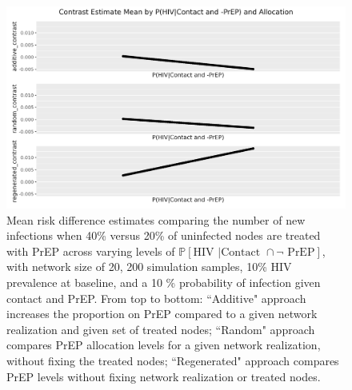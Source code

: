 \documentclass{article}
\theoremstyle{definition}
\begin{document}
\begin{figure}[H]
    \centering
    \includegraphics[width=\linewidth]{Corrected Figures/p1 Mean plots.png}
    \caption{Mean risk difference estimates comparing the number of new infections when 40\% versus 20\% of uninfected nodes are treated with PrEP across varying levels of  $\mathbb{P}\left[\text{HIV } \vert \text {Contact } \cap \neg \text{ PrEP}\right]$, with network size of 20,  200 simulation samples,  10\% HIV prevalence at baseline, and a 10 \% probability of infection given contact and PrEP.
    From top to bottom: ``Additive" approach increases the proportion on PrEP compared to a given network realization and given set of treated nodes; ``Random" approach compares PrEP allocation levels for a given network realization, without fixing the treated nodes; ``Regenerated" approach compares PrEP levels without fixing network realization or treated nodes.}
    \label{fig:Figure 10}
\end{figure}
\end{document}
